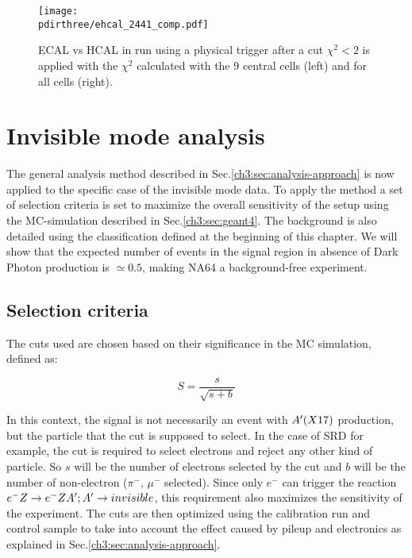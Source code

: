 \begin{figure}[h!]
  \begin{center}
    \texttt{[image: \\pdirthree/ehcal\_2441\_comp.pdf]}
  \end{center}
  \caption[ECAL vs HCAL energy deposit after a cut $\chi^2$ for different ECAL configurations]{ECAL vs HCAL in run using a physical trigger after a cut $\chi^2<2$ is applied with the $\chi^2$ calculated with the 9 central cells (left) and for all cells (right).}
  \label{fig:ehcal_comp}
\end{figure}

\section{Invisible mode analysis}
\label{ch3:sec:analysis-invis}

The general analysis method described in Sec.\ref{ch3:sec:analysis-approach} is now applied to the specific case of the invisible mode data. To apply the method a set of selection criteria is set to maximize the overall sensitivity of the setup using the MC-simulation described in Sec.\ref{ch3:sec:geant4}. The background is also detailed using the classification defined at the beginning of this chapter. We will show that the expected number of events in the signal region in absence of Dark Photon production is $\simeq 0.5$, making NA64 a background-free experiment.

\subsection{Selection criteria}
\label{ch3:sec:selection-criteria}

The cuts used are chosen based on their significance in the MC simulation, defined as:

\begin{equation}
  \label{eq:significance}
  S = \frac{s}{\sqrt{s + b}}
\end{equation}

In this context, the signal is not necessarily an event with $A'(X17)$ production, but the particle that the cut is supposed to select.
In the case of SRD for example, the cut is required to select electrons and reject any other kind of particle. So $s$ will be the number of electrons selected by the cut and $b$ will be the number of non-electron ($\pi^-$, $\mu^-$ selected). Since only $e^{-}$ can trigger the reaction $e^- Z \to e^- Z A'; A' \to invisible$, this requirement also maximizes the sensitivity of the experiment. The cuts are then optimized using the calibration run and control sample to take into account the effect caused by pileup and electronics as explained in Sec.\ref{ch3:sec:analysis-approach}.

